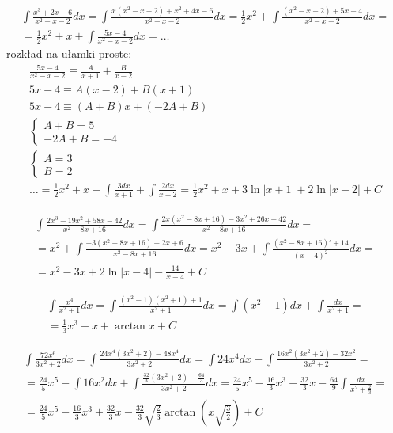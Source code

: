 
\begin{gather*}\int \frac{x^3+2x-6}{x^2-x-2}dx = \int \frac{x(x^2-x-2)+x^2+4x-6}{x^2-x-2}dx = \frac{1}{2}x^2 + \int \frac{(x^2-x-2)+5x-4}{x^2-x-2}dx = \\
= \frac{1}{2}x^2+x+\int \frac{5x-4}{x^2-x-2}dx= \ldots\end{gather*}
rozkład na ułamki proste:
\begin{gather*}\frac{5x-4}{x^2-x-2} \equiv \frac{A}{x+1}+\frac{B}{x-2} \\
5x-4 \equiv A(x-2)+B(x+1) \\
5x-4 \equiv (A+B)x+(-2A+B) \\
\begin{cases} A+B=5 \\ -2A+B=-4 \end{cases} \\
\begin{cases} A=3 \\ B=2 \end{cases} \\
\ldots = \frac{1}{2}x^2+x+\int \frac{3dx}{x+1}+\int \frac{2dx}{x-2} = \frac{1}{2}x^2+x+3\ln|x+1|+2\ln|x-2|+C\end{gather*}



\begin{gather*}\int \frac{2x^3-19x^2+58x-42}{x^2-8x+16}dx = \int \frac{2x(x^2-8x+16)-3x^2+26x-42}{x^2-8x+16}dx = \\
= x^2 + \int \frac{-3(x^2-8x+16)+2x+6}{x^2-8x+16}dx = x^2-3x+\int \frac{(x^2-8x+16)'+14}{(x-4)^2}dx = \\
= x^2-3x+2\ln|x-4|-\frac{14}{x-4}+C\end{gather*}



\begin{gather*}\int \frac{x^4}{x^2+1}dx = \int \frac{(x^2-1)(x^2+1)+1}{x^2+1}dx=\int (x^2-1)dx+\int \frac{dx}{x^2+1}= \\
=\frac{1}{3}x^3-x+\arctan x +C\end{gather*}



\begin{gather*}\int \frac{72x^6}{3x^2+2}dx = \int \frac{24x^4(3x^2+2)-48x^4}{3x^2+2}dx = \int 24x^4dx - \int \frac{16x^2(3x^2+2)-32x^2}{3x^2+2} = \\
= \frac{24}{5}x^5 - \int 16x^2dx + \int \frac{\frac{32}{3}(3x^2+2)-\frac{64}{3}}{3x^2+2}dx = \frac{24}{5}x^5 - \frac{16}{3}x^3 +\frac{32}{3}x-\frac{64}{9}\int \frac{dx}{x^2+\frac{2}{3}}= \\
= \frac{24}{5}x^5 - \frac{16}{3}x^3 +\frac{32}{3}x-\frac{32}{3}\sqrt{\frac{2}{3}}\arctan \left( x\sqrt{\frac{3}{2}}\right)+C\end{gather*}


